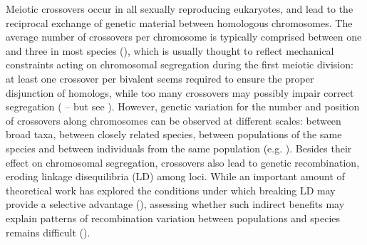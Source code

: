 \documentclass{article}
\begin{document}
Meiotic crossovers occur in all sexually reproducing eukaryotes, and lead to the reciprocal exchange of genetic material between homologous chromosomes. The average number of crossovers per chromosome is typically comprised between one and three in most species (\cite{stapleyVariationRecombinationFrequency2017,fernandesUnleashingMeioticCrossovers2018,brazierDiversityDeterminantsRecombination2022b}), which is usually thought to reflect mechanical constraints acting on chromosomal segregation during the first meiotic division: at least one crossover per bivalent seems required to ensure the proper disjunction of homologs, while too many crossovers may possibly impair correct segregation (\cite{koehlerRecombinationNondisjunctionHumans1996} – but see \cite{fernandesUnleashingMeioticCrossovers2018}). However, genetic variation for the number and position of crossovers along chromosomes can be observed at different scales: between broad taxa, between closely related species, between populations of the same species and between individuals from the same population (e.g. \cite{stapleyVariationRecombinationFrequency2017,dumontVariationGenomicRecombination2009,johnstonConservedGeneticArchitecture2016,brazierDiversityDeterminantsRecombination2022b,penalbaGenomeIconicAustralian2020,samukNaturalSelectionShapes2020}). Besides their effect on chromosomal segregation, crossovers also lead to genetic recombination, eroding linkage disequilibria (LD) among loci. While an important amount of theoretical work has explored the conditions under which breaking LD may provide a selective advantage (\cite{lenormandEvolutionRecombinationHeterogeneous,agrawalEvolutionSexWhy2006,ottoEvolutionaryEnigmaSex2009}), assessing whether such indirect benefits may explain patterns of recombination variation between populations and species remains difficult (\cite{dapperConnectingTheoryData2017,ritzVariationRecombinationRate2017}).
\end{document}
